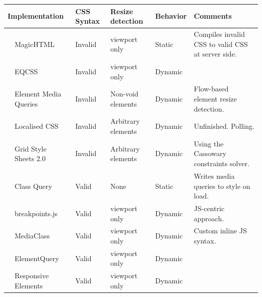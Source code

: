 \documentclass[a4paper,11pt]{kth-mag}
\begin{document}
    \begin{table}[ht]\center
      \tiny
      \begin{tabular}[t]{ l p{3cm} l l l p{3cm} }
        \multicolumn{2}{l}{Implementation} & \gls{CSS} Syntax & Resize detection & Behavior & Comments \\
        \hline
        \cite{eq_imp_magichtml} &             MagicHTML &                                   Invalid &   \Gls{viewport} only &       Static &    Compiles invalid CSS to valid CSS at server side. \\
        \cite{eq_imp_eqcss} &                 EQCSS &                                       Invalid &   \Gls{viewport} only &       Dynamic     \\
        \cite{eq_imp_prollyfill-min-width} &  Element Media Queries &                       Invalid &   Non-void \glspl{element} &   Dynamic &   Flow-based element resize detection. \\
        \cite{eq_imp_localised-css} &         Localised CSS &                               Invalid &   Arbitrary \glspl{element} &  Dynamic &   Unfinished. Polling. \\
        \cite{eq_imp_gss} &                   Grid Style Sheets 2.0 &                       Invalid &   Arbitrary \glspl{element} &  Dynamic &   Using the Cassowary constraints solver. \\
        \cite{eq_imp_classquery} &            Class Query &                                 Valid &     None &                Static &    Writes \gls{media queries} to style on load. \\
        \cite{eq_imp_breakpointsjs} &         breakpoints.js &                              Valid &     \Gls{viewport} only &       Dynamic &   JS-centric approach. \\
        \cite{eq_imp_mediaclass} &            MediaClass &                                  Valid &     \Gls{viewport} only &       Dynamic &   Custom inline JS syntax. \\
        \cite{eq_imp_elementquery} &          ElementQuery &                                Valid &     \Gls{viewport} only &       Dynamic &   \\
        \cite{eq_imp_responsive-elements} &   Responsive Elements &                         Valid &     \Gls{viewport} only &       Dynamic &   \\

\end{tabular}
\end{table}
\end{document}
